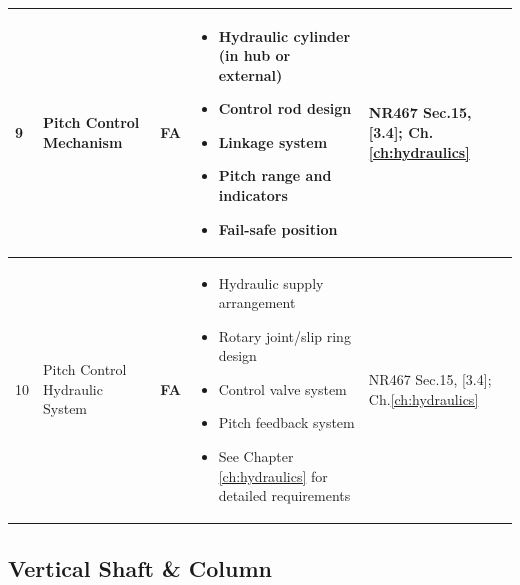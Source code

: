 \documentclass[11pt,a4paper]{report}
\newcommand{\fa}{\textbf{\textcolor{warningred}{FA}}}
\begin{document}
\begin{longtable}{|p{0.5cm}|p{5cm}|p{1.5cm}|p{5.5cm}|p{2cm}|}
9 & Pitch Control Mechanism & \fa{} & 
\begin{itemize}[leftmargin=*,nosep]
\item Hydraulic cylinder (in hub or external)
\item Control rod design
\item Linkage system
\item Pitch range and indicators
\item Fail-safe position
\end{itemize} & NR467 Sec.15, [3.4]; Ch.\ref{ch:hydraulics} \\
\hline

10 & Pitch Control Hydraulic System & \fa{} & 
\begin{itemize}[leftmargin=*,nosep]
\item Hydraulic supply arrangement
\item Rotary joint/slip ring design
\item Control valve system
\item Pitch feedback system
\item See Chapter \ref{ch:hydraulics} for detailed requirements
\end{itemize} & NR467 Sec.15, [3.4]; Ch.\ref{ch:hydraulics} \\
\hline

\end{longtable}

\subsection{Vertical Shaft \& Column}
\end{document}
